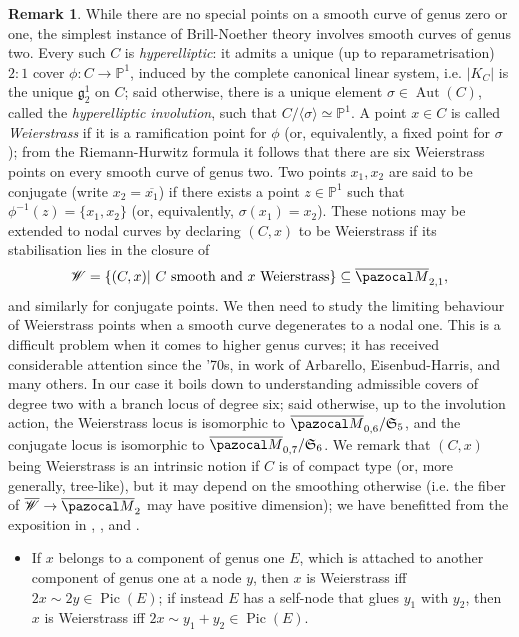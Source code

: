 \documentclass[11pt]{amsart}
\newcommand{\PP}{\mathbb P}
\renewcommand{\to}{\rightarrow}
\newcommand{\oM}{\overline{\pazocal M}}
\newcommand{\Pic}{\operatorname{Pic}}
\newcommand{\Aut}{\operatorname{Aut}}
\theoremstyle{plain}
\theoremstyle{definition}
\newtheorem{rem}[thm]{Remark}
\begin{document}
\begin{rem}\label{rmk:Wandconj}
 While there are no special points on a smooth curve of genus zero or one, the simplest instance of Brill-Noether theory involves smooth curves of genus two. Every such $C$ is \emph{hyperelliptic}: it admits a unique (up to reparametrisation) $2:1$ cover $\phi\colon C\to\PP^1$, induced by the complete canonical linear system, i.e. $\lvert K_C\rvert$ is the unique $\mathfrak g^1_2$ on $C$; said otherwise, there is a unique element $\sigma\in\Aut(C)$, called the \emph{hyperelliptic involution}, such that $C/\langle\sigma\rangle\simeq\PP^1$. A point $x\in C$ is called \emph{Weierstrass} if it is a ramification point for $\phi$ (or, equivalently, a fixed point for $\sigma$); from the Riemann-Hurwitz formula it follows that there are six Weierstrass points on every smooth curve of genus two. Two points $x_1,x_2$ are said to be conjugate (write $x_2=\overline{x_1}$) if there exists a point $z\in\PP^1$ such that $\phi^{-1}(z)=\{x_1,x_2\}$ (or, equivalently, $\sigma(x_1)=x_2$). These notions may be extended to nodal curves by declaring $(C,x)$ to be Weierstrass if its stabilisation lies in the closure of
 \[\mathcal W=\{(C,x)|\ C\text{ smooth and } x \text{ Weierstrass}\}\subseteq\oM_{2,1},\]
 and similarly for conjugate points. We then need to study the limiting behaviour of Weierstrass points when a smooth curve degenerates to a nodal one. This is a difficult problem when it comes to higher genus curves; it has received considerable attention since the '70s, in work of Arbarello, Eisenbud-Harris, and many others. In our case it boils down to understanding admissible covers \cite{HarrisMumford} of degree two with a branch locus of degree six; said otherwise, up to the involution action, the Weierstrass locus is isomorphic to $\oM_{0,6}/\mathfrak S_5$, and the conjugate locus is isomorphic to  $\oM_{0,7}/\mathfrak S_6$. We remark that $(C,x)$ being Weierstrass is an intrinsic notion if $C$ is of compact type (or, more generally, tree-like), but it may depend on the smoothing otherwise (i.e. the fiber of $\overline{\mathcal W}\to\oM_2$ may have positive dimension); we have benefitted from the exposition in \cite[Appendix 2]{Diaz}, \cite[Proposition (3.0.6)]{Cukierman}, and \cite[Theorem 5.45]{HM}.
 \begin{itemize}[leftmargin=.5cm]
  \item If $x$ belongs to a component of genus one $E$, which is attached to another component of genus one at a node $y$, then $x$ is Weierstrass iff $2x\sim 2y\in\Pic(E)$; if instead $E$ has a self-node that glues $y_1$ with $y_2$, then $x$ is Weierstrass iff $2x\sim y_1+y_2\in\Pic(E)$.
  

\end{itemize}
\end{rem}
\end{document}
